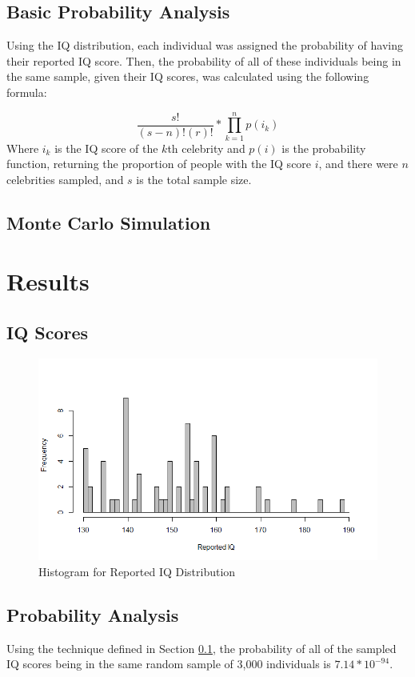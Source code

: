 \documentclass[12pt,letterpaper,titlepage,oneside]{article}
\begin{document}
\subsection{Basic Probability Analysis}
\label{probanal}
Using the IQ distribution, each individual was assigned the probability of having their reported IQ score. Then, the probability of all of these individuals being in the same sample, given their IQ scores, was calculated using the following formula:

\begin{equation}
\frac{s!}{(s-n)!(r)!} * \prod_{k=1}^n p(i_k)
\end{equation}
Where $i_k$ is the IQ score of the $k$th celebrity and $p(i)$ is the probability function, returning the proportion of people with the IQ score $i$, and there were $n$ celebrities sampled, and $s$ is the total sample size.

\subsection{Monte Carlo Simulation} 

\section{Results}
\subsection{IQ Scores}

\begin{figure}[h!]
\caption{Histogram for Reported IQ Distribution}
\label{iqhist}
\includegraphics[scale=.5]{reported-iq}
\end{figure}

\subsection{Probability Analysis}
Using the technique defined in Section \ref{probanal}, the probability of all of the sampled IQ scores being in the same random sample of 3,000 individuals is $7.14*10^{-94}$.
\end{document}
